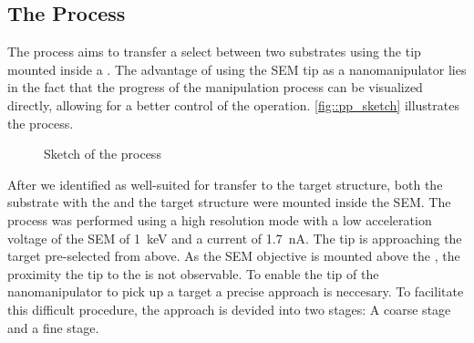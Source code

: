 	\subsection{The \PP Process}

			The \pp process aims to transfer a select \nd between two substrates using the tip mounted inside a \sem. The advantage of using the SEM tip as a nanomanipulator lies in the fact that the progress of the manipulation process can be visualized directly, allowing for a better control of the operation. \autoref{fig::pp_sketch} illustrates the process.

			\begin{figure}[htp]
				\centering
				\caption{Sketch of the \pp process}
				\label{fig::pp_sketch}
			\end{figure}

	After we identified \nds as well-suited for transfer to the target structure, both the substrate with the \nds and the target structure were mounted inside the SEM.
	The process was performed using a high resolution mode with a low acceleration voltage of the SEM of \SI{1}{\kilo\electronvolt} and a current of \SI{1.7}{\nano\ampere}.
	The tip is approaching the target pre-selected \nd from above.
	As the SEM objective is mounted above the \np, the proximity the \np tip  to the \nd is not observable.
	To enable the tip of the nanomanipulator to pick up a target \nd a precise approach is neccesary. To facilitate this difficult procedure, the approach is devided into two stages: A coarse stage and a fine stage.

